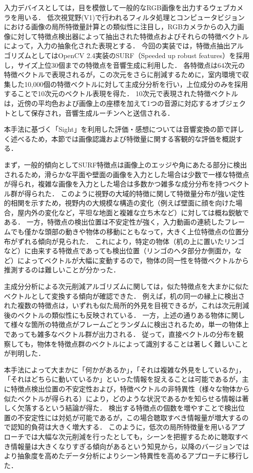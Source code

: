 入力デバイスとしては，目を模倣して一般的なRGB画像を出力するウェブカメラを用いる．
低次視覚野(V1)で行われるフィルタ処理とコンピュータビジョンにおける画像の局所特徴量計算との類似性に注目し，RGBカメラからの入力画像に対して特徴点検出器によって抽出された特徴点およびそれらの特徴ベクトルによって，入力の抽象化された表現とする．
今回の実装では，特徴点抽出アルゴリズムとしてはOpenCV 2.4実装のSURF（Speeded up robust features）を採用し，サイズ上位30個までの特徴点を音響生成に利用した．
各特徴点は64次元の特徴ベクトルで表現されるが，この次元をさらに削減するために，室内環境で収集した10,000個の特徴ベクトルに対して主成分分析を行い，上位成分のみを採用することで10次元のベクトル表現を得た．
10次元で表現された特徴ベクトルは，近傍の平均色および画像上の座標を加えて1つの音源に対応するオブジェクトとして保存され，音響生成ルーチンへと送信される．

本手法に基づく「Sight」を利用した評価・感想については音響変換の節で詳しく述べるため，本節では画像認識および特徴量に関する客観的な評価を概説する．

まず，一般的傾向としてSURF特徴点は画像上のエッジや角にあたる部分に検出されるため，滑らかな平面や壁面の画像を入力とした場合は少数で一様な特徴点が得られ，複雑な画像を入力とした場合は多数かつ雑多な成分分布を持つベクトル群が得られた．
このように視野の大域的特徴に関して特徴量分布が強い定性的相関を示すため，視野内の大規模な構造の変化（例えば壁面に顔を向けた場合，屋内外の変化など，平坦な地面と複雑な立ち木など）に対しては概ね鋭敏である．
一方，特徴点の検出位置は不安定性が強く，入力動画の連続したフレームでも僅かな頭部の動きや物体の移動にともなって，大きく上位特徴点の位置分布がずれる傾向が見られた．
これにより，特定の物体（机の上に置いたリンゴなど）に由来する特徴点であっても検出位置（リンゴのヘタ部分か側面か，など）によってベクトルが大幅に変動するので，物体の同一性を特徴ベクトルから推測するのは難しいことが分かった．

主成分分析による次元削減アルゴリズムに関しては，似た特徴点を大まかに似たベクトルとして変換する傾向が確認できた．
例えば，机の同一の縁上に検出された複数の特徴点は，いずれも似た局所的外見を目視できるが，これは次元削減後のベクトルの類似性にも反映されている．
一方，上述の通りある物体に関して様々な箇所の特徴点がフレームごとランダムに検出されるため，単一の物体上であっても雑多なベクトル群が出力される．
従って，直接ベクトルの分布を観察しても，物体を特徴点群のベクトルによって識別することは著しく難しいことが判明した．

本手法によって大まかに「何かがあるか」，「それは複雑な外見をしているか」，「それはどちらに動いているか」といった情報を捉えることは可能であるが，主に特徴点検出位置の不安定性および，特徴ベクトルの非特異性（様々な物体から似たベクトルが得られる）により，どのような状況であるかを知らせる情報は著しく欠落するという結論が得た．
検出する特徴点の個数を増やすことで検出位置の不安定性には対処が可能であるが，この場合聴取すべき情報量が増大するので認知的負荷は大きく増大する．
このように，低次の局所特徴量を用いるアプローチでは大幅な次元削減を行ったとしても，シーンを把握するために聴取すべき情報量は大きくなりすぎる傾向があるという知見から，以降のバージョンではより抽象度を高めたデータ分析によりシーン特異性を高めるアプローチに移行した．

